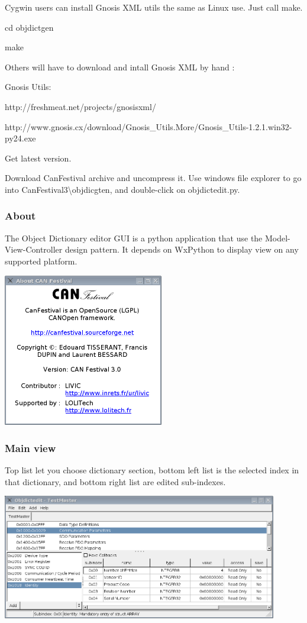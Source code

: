 \documentclass[a4paper,12pt]{book}
\begin{document}
Cygwin users can install Gnosis XML utils the same as Linux use. Just
call make.

{\ttfamily
cd objdictgen}

{\ttfamily
make}

Others will have to download and intall Gnosis XML by hand :

{\ttfamily
Gnosis Utils:}

{\ttfamily
http://freshmeat.net/projects/gnosisxml/}

{\ttfamily
http://www.gnosis.cx/download/Gnosis\_Utils.More/Gnosis\_Utils{}-1.2.1.win32{}-py24.exe}

{\ttfamily
Get latest version.}

Download CanFestival archive and uncompress it. Use windows file
explorer to go into CanFestival3{\textbackslash}objdicgten, and
double{}-click on objdictedit.py.

\subsubsection{About}
The Object Dictionary editor GUI is a python application that use the
Model{}-View{}-Controller design pattern. It depends on WxPython to
display view on any supported platform.

 \begin{center}
   \includegraphics[width=7cm]{Pictures/10000201000001FC000001E5D65E8766.png}
\end{center}

\subsubsection{Main view}
Top list let you choose dictionary section, bottom left list is the
selected index in that dictionary, and bottom right list are edited
sub{}-indexes.

 \begin{center}
   \includegraphics[width=12cm]{Pictures/10000201000003E7000001C7B0296577.png}
\end{center}
\end{document}
